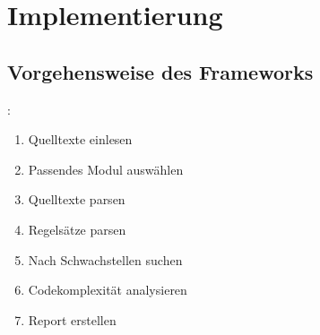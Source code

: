 \section{Implementierung}
    \subsection{Vorgehensweise des Frameworks}
        \begin{frame}{\secname: \subsecname}
            \begin{enumerate}
                \item Quelltexte einlesen
                \item Passendes Modul auswählen
                \item Quelltexte parsen
                \item Regelsätze parsen
                \item Nach Schwachstellen suchen
                \item Codekomplexität analysieren
                \item Report erstellen
            \end{enumerate}
        \end{frame}


